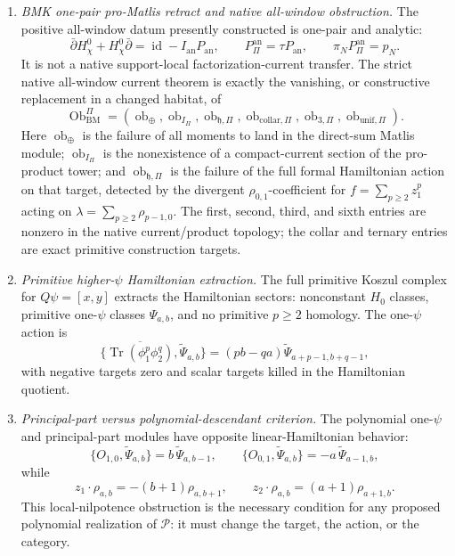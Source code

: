 \begin{enumerate}
  \item \emph{BMK one-pair pro-Matlis retract and native all-window
  obstruction.}
  The positive all-window datum presently constructed is one-pair and
  analytic:
  \[
    \bar\partial H_\chi^0+H_\chi^0\bar\partial
    =
    \operatorname{id}-I_{\mathrm{an}}P_{\mathrm{an}},
    \qquad
    P_{\Pi}^{\mathrm{an}}=\tau P_{\mathrm{an}},
    \qquad
    \pi_NP_{\Pi}^{\mathrm{an}}=p_N .
  \]
  It is not a native support-local factorization-current transfer.  The
  strict native all-window current theorem is exactly the vanishing, or
  constructive replacement in a changed habitat, of
  \[
    \operatorname{Ob}^{\Pi}_{\mathrm{BM}}
    =
    (\operatorname{ob}_{\oplus},
     \operatorname{ob}_{I_\Pi},
     \operatorname{ob}_{\mathfrak h,\Pi},
     \operatorname{ob}_{\mathrm{collar},\Pi},
     \operatorname{ob}_{3,\Pi},
     \operatorname{ob}_{\mathrm{unif},\Pi}).
  \]
  Here \(\operatorname{ob}_{\oplus}\) is the failure of all moments to
  land in the direct-sum Matlis module; \(\operatorname{ob}_{I_\Pi}\) is
  the nonexistence of a compact-current section of the pro-product tower;
  and \(\operatorname{ob}_{\mathfrak h,\Pi}\) is the failure of the full
  formal Hamiltonian action on that target, detected by the divergent
  \(\rho_{0,1}\)-coefficient for
  \(f=\sum_{p\ge2}z_1^p\) acting on
  \(\lambda=\sum_{p\ge2}\rho_{p-1,0}\).  The first, second, third, and
  sixth entries are nonzero in the native current/product topology; the
  collar and ternary entries are exact primitive construction targets.

  \item \emph{Primitive higher-\(\psi\) Hamiltonian extraction.}
  The full primitive Koszul complex for \(Q\psi=[x,y]\) extracts the
  Hamiltonian sectors:
  nonconstant \(H_0\) classes, primitive one-\(\psi\) classes
  \(\Psi_{a,b}\), and no primitive \(p\ge2\) homology.  The one-\(\psi\)
  action is
  \[
    \{\overline{\operatorname{Tr}(\phi_1^p\phi_2^q)},
      \widetilde\Psi_{a,b}\}
    =(pb-qa)\widetilde\Psi_{a+p-1,b+q-1},
  \]
  with negative targets zero and scalar targets killed in the
  Hamiltonian quotient.

  \item \emph{Principal-part versus polynomial-descendant criterion.}
  The polynomial one-\(\psi\) and principal-part modules have opposite
  linear-Hamiltonian behavior:
  \[
    \{O_{1,0},\widetilde\Psi_{a,b}\}
      =b\,\widetilde\Psi_{a,b-1},
    \qquad
    \{O_{0,1},\widetilde\Psi_{a,b}\}
      =-a\,\widetilde\Psi_{a-1,b},
  \]
  while
  \[
    z_1\cdot\rho_{a,b}=-(b+1)\rho_{a,b+1},
    \qquad
    z_2\cdot\rho_{a,b}=(a+1)\rho_{a+1,b}.
  \]
  This local-nilpotence obstruction is the necessary condition for any
  proposed polynomial realization of \(\mathcal P\): it must change the
  target, the action, or the category.


\end{enumerate}
